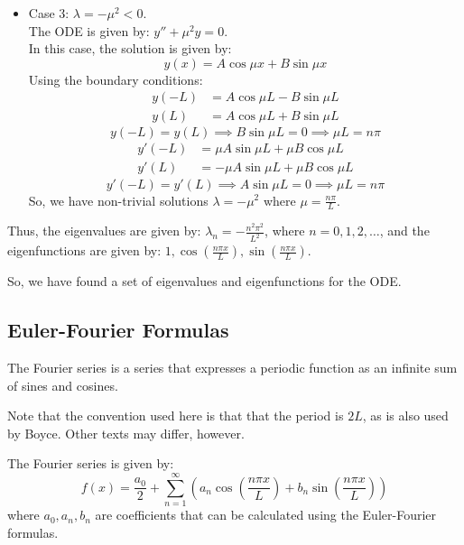 \begin{eg}
\begin{itemize}
		\item Case 3: $\lambda = -\mu^2 < 0$.\\
		The ODE is given by: $y'' + \mu^2 y = 0$.\\
		In this case, the solution is given by:
		\[
		y(x) = A \cos{\mu x} + B \sin{\mu x}
		\]
		Using the boundary conditions:
		\begin{align*}
			y(-L) & = A \cos{\mu L} - B \sin{\mu L} \\
			y(L) & = A \cos{\mu L} + B \sin{\mu L}
		\end{align*}
		\[
		y(-L) = y(L) \implies B \sin{\mu L} = 0 \implies \mu L = n \pi
		\]
		\begin{align*}
			y'(-L) & = \mu A \sin{\mu L} + \mu B \cos{\mu L} \\
			y'(L) & = -\mu A \sin{\mu L} + \mu B \cos{\mu L}
		\end{align*}
		\[
		y'(-L) = y'(L) \implies A \sin{\mu L} = 0 \implies \mu L = n \pi
		\]
		So, we have non-trivial solutions $\lambda = -\mu^2$ where $\mu = \frac{n \pi}{L}$.
	\end{itemize}
	Thus, the eigenvalues are given by: $\lambda_n = -\frac{n^2\pi^2}{L^2}$, where $n =0, 1, 2, \dots$, and the eigenfunctions are given by: $1, \cos\left(\frac{n\pi x}{L}\right), \sin\left(\frac{n\pi x}{L}\right)$.
	
	So, we have found a set of eigenvalues and eigenfunctions for the ODE.
\end{eg}

\subsection{Euler-Fourier Formulas}

The Fourier series is a series that expresses a periodic function as an infinite sum of sines and cosines.

\begin{remark}
	Note that the convention used here is that that the period is $2L$, as is also used by Boyce. Other texts may differ, however.
\end{remark}

The Fourier series is given by: 
\begin{equation}\label{eq:fourier}
	f(x) = \frac{a_0}{2} + \sum_{n=1}^{\infty} \left(a_n \cos{\left(\frac{n\pi x}{L}\right)} + b_n \sin{\left(\frac{n\pi x}{L}\right)}\right)
\end{equation}
where $a_0, a_n, b_n$ are coefficients that can be calculated using the Euler-Fourier formulas.

